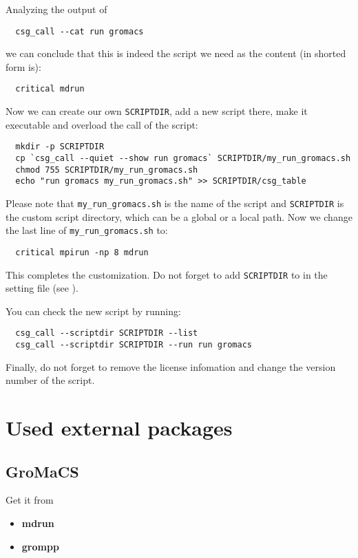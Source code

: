 Analyzing the output of
\begin{verbatim}
  csg_call --cat run gromacs
\end{verbatim}
we can conclude that this is indeed the script we need as the content (in shorted form is):
%
\begin{verbatim}
  critical mdrun
\end{verbatim}
Now we can create our own \texttt{SCRIPTDIR}, add a new script there, make it executable and overload the call of the script:
\begin{verbatim}
  mkdir -p SCRIPTDIR
  cp `csg_call --quiet --show run gromacs` SCRIPTDIR/my_run_gromacs.sh
  chmod 755 SCRIPTDIR/my_run_gromacs.sh
  echo "run gromacs my_run_gromacs.sh" >> SCRIPTDIR/csg_table
\end{verbatim}
Please note that \texttt{my\_run\_gromacs.sh} is the name of the script and \texttt{SCRIPTDIR} is the custom script directory, which can be a global or a local path.
Now we change the last line of \texttt{my\_run\_gromacs.sh} to:
\begin{verbatim}
  critical mpirun -np 8 mdrun
\end{verbatim}
This completes the customization. Do not forget to add \texttt{SCRIPTDIR} to  in the setting \xml file (see ).

You can check the new script by running:
\begin{verbatim}
  csg_call --scriptdir SCRIPTDIR --list
  csg_call --scriptdir SCRIPTDIR --run run gromacs
\end{verbatim}

Finally, do not forget to remove the license infomation and change the version number of the script.

\section{Used external packages}

\subsection{GroMaCS}
\label{progpack.gromacs}
Get it from 
\begin{itemize}
\item \hypertarget{progex.mdrun}{\textbf{mdrun}}
\item \hypertarget{progex.grompp}{\textbf{grompp}}
\end{itemize}

